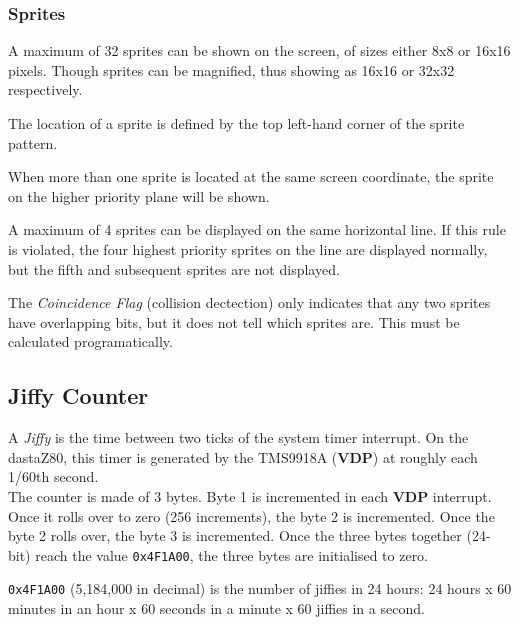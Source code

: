     \subsubsection{Sprites}

    A maximum of 32 sprites can be shown on the screen, of sizes either 8x8 or
    16x16 pixels. Though sprites can be magnified, thus showing as 16x16 or
    32x32 respectively.

    The location of a sprite is defined by the top left-hand corner of the
    sprite pattern.

    When more than one sprite is located at the same screen coordinate, the
    sprite on the higher priority plane will be shown.

    A maximum of 4 sprites can be displayed on the same horizontal line. If this
    rule is violated, the four highest priority sprites on the line are
    displayed normally, but the fifth and subsequent sprites are not displayed.

    The \textit{Coincidence Flag} (collision dectection) only indicates that
    any two sprites have overlapping bits, but it does not tell which sprites
    are. This must be calculated programatically.

    \subsection{Jiffy Counter}
    \label{subsec:jiffy_counter}

    A \textit{Jiffy} is the time between two ticks of the system timer interrupt.
    On the dastaZ80, this timer is generated by the TMS9918A (\textbf{VDP}) at
    roughly each 1/60th second.\\

    The counter is made of 3 bytes. Byte 1 is incremented in each \textbf{VDP}
    interrupt. Once it rolls over to zero (256 increments), the byte 2 is
    incremented. Once the byte 2 rolls over, the byte 3 is incremented. Once the
    three bytes together (24-bit) reach the value \texttt{0x4F1A00}, the three
    bytes are initialised to zero.

    \texttt{0x4F1A00} (5,184,000 in decimal) is the number of jiffies in 24
    hours: 24 hours x 60 minutes in an hour x 60 seconds in a minute x 60
    jiffies in a second.


